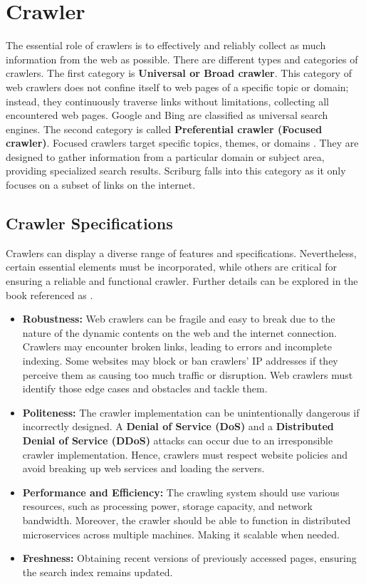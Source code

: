 \section{Crawler}
\label{sec:crawler}
The essential role of crawlers is to effectively and reliably collect as much information from the web as possible. There are different types and categories of crawlers. The first category is  \textbf{Universal or Broad crawler}. This category of web crawlers does not confine itself to web pages of a specific topic or domain; instead, they continuously traverse links without limitations, collecting all encountered web pages. Google and Bing are classified as universal search engines. The second category is called \textbf{Preferential crawler (Focused crawler)}. Focused crawlers target specific topics, themes, or domains \cite{kumar2017survey}. They are designed to gather information from a particular domain or subject area, providing specialized search results. Scriburg falls into this category as it only focuses on a subset of links on the internet.

\subsection{Crawler Specifications}
\label{sec:cralwer-specifications}
Crawlers can display a diverse range of features and specifications. Nevertheless, certain essential elements must be incorporated, while others are critical for ensuring a reliable and functional crawler. Further details can be explored in the book referenced as \cite{manning2008}.

\begin{itemize}
\item[] \textbf{Robustness:} Web crawlers can be fragile and easy to break due to the nature of the dynamic contents on the web and the internet connection. Crawlers may encounter broken links, leading to errors and incomplete indexing. Some websites may block or ban crawlers' IP addresses if they perceive them as causing too much traffic or disruption. Web crawlers must identify those edge cases and obstacles and tackle them.

\item[] \textbf{Politeness:} The crawler implementation can be unintentionally dangerous if incorrectly designed. A \textbf{Denial of Service (DoS)} and a \textbf{Distributed Denial of Service (DDoS)} attacks can occur due to an irresponsible crawler implementation. Hence, crawlers must respect website policies and avoid breaking up web services and loading the servers.

\item[] \textbf{Performance and Efficiency:} The crawling system should use various resources, such as processing power, storage capacity, and network bandwidth. Moreover, the crawler should be able to function in distributed microservices across multiple machines. Making it scalable when needed.

\item[] \textbf{Freshness:} Obtaining recent versions of previously accessed pages, ensuring the search index remains updated.
\end{itemize}

